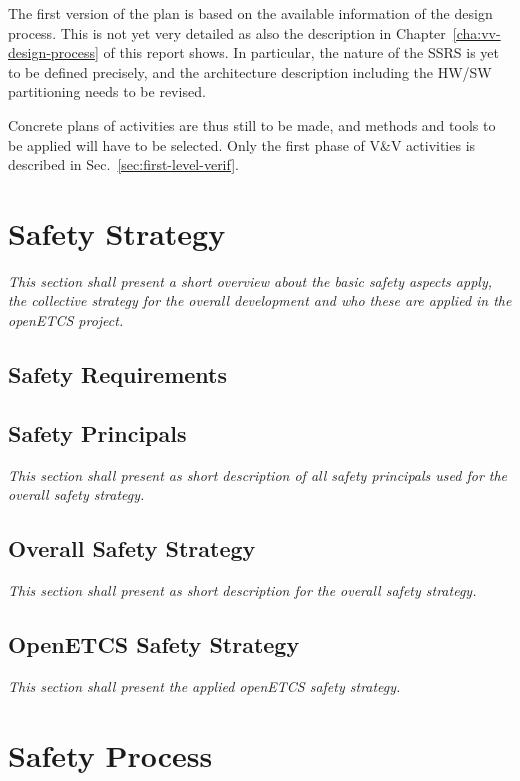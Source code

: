 \documentclass{template/openetcs_report}
\begin{document}
The first version of the plan is based on the available information of
the design process. This is not yet very detailed as also the
description in Chapter~\ref{cha:vv-design-process} of this report
shows. In particular, the nature of the SSRS is yet to be defined
precisely, and the architecture description including the HW/SW
partitioning needs to be revised.

Concrete plans of activities are thus still to be made, and methods
and tools to be applied will have to be selected. Only the first phase
of V\&V activities is described in Sec.~\ref{sec:first-level-verif}.

\chapter{Safety Strategy}

\textit{This section shall present a short overview about the basic safety aspects apply, the collective strategy for the overall development and who these are applied in the openETCS project.}

\section{Safety Requirements}



\section{Safety Principals}

\textit{This section shall present as short description of all safety principals used for the overall safety strategy.}

\section{Overall Safety Strategy}

\textit{This section shall present as short description for the overall safety strategy.}

\section{OpenETCS Safety Strategy}

\textit{This section shall present the applied openETCS safety strategy.}

\chapter{Safety Process}
\end{document}
